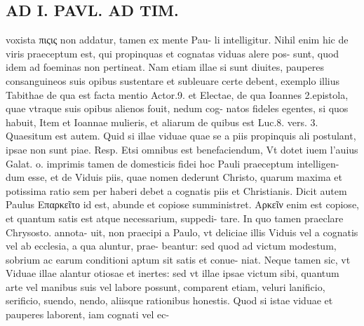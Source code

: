 \documentclass{article}
\begin{document}
\begin{pages}
\section*{AD I. PAVL. AD TIM. }
\marginpar{[ p.302 ]}\pstart voxista πιςις non addatur, tamen ex mente Pau- li intelligitur. Nihil enim hic de viris praeceptum est, qui propinquas et cognatas viduas alere pos- sunt, quod idem ad foeminas non pertineat. Nam etiam illae si sunt diuites, pauperes consanguineos suis opibus sustentare et subleuare certe debent, exemplo illius Tabithae de qua est facta mentio Actor.9. et Electae, de qua Ioannes 2.epistola, quae vtraque suis opibus alienos fouit, nedum cog- natos fideles egentes, si quos habuit, Item et Ioannae mulieris, et aliarum de quibus est Luc.8. vers. 3. Quaesitum est autem. Quid si illae viduae quae se a piis propinquis ali postulant, ipsae non sunt piae. Resp. Etsi omnibus est benefaciendum, Vt dotet iuem l'auius Galat. o. imprimis tamen de domesticis fidei hoc Pauli praeceptum intelligen- dum esse, et de Viduis piis, quae nomen dederunt Christo, quarum maxima et potissima ratio sem per haberi debet a cognatis piis et Christianis.  \pend\pstart Dicit autem Paulus Επαρκεῖτο id est, abunde et copiose sumministret. Αρκεῖν enim est copiose, et quantum satis est atque necessarium, suppedi- tare. In quo tamen praeclare Chrysosto. annota- uit, non praecipi a Paulo, vt deliciae illis Viduis vel a cognatis vel ab ecclesia, a qua aluntur, prae- beantur: sed quod ad victum modestum, sobrium ac earum conditioni aptum sit satis et conue- niat. Neque tamen sic, vt Viduae illae alantur otiosae et inertes: sed vt illae ipsae victum sibi, quantum arte vel manibus suis vel labore possunt, comparent etiam, veluri lanificio, serificio, suendo, nendo, aliisque rationibus honestis. Quod si istae viduae et pauperes laborent, iam cognati vel ec-  \pend

\end{pages}
\end{document}
